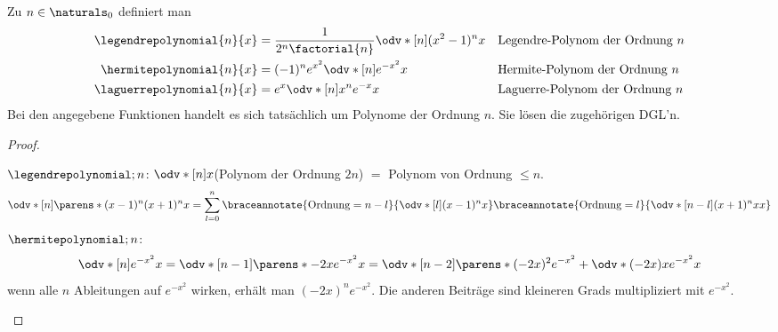 \begin{lemma}
  Zu \( n\in \naturals_0 \) definiert man
  \begin{align*}
    \legendrepolynomial{n}{x}&=\frac{1}{2^n \factorial{n}}\odv*[n]{(x^2-1)^n}{x}&&\text{Legendre-Polynom der Ordnung \( n \)}\\
    \hermitepolynomial{n}{x}&=(-1)^n e^{x^2}\odv*[n]{e^{-x^2}}{x}&&\text{Hermite-Polynom der Ordnung \( n \)}\\
    \laguerrepolynomial{n}{x}&=e^x\odv*[n]{x^n e^{-x}}{x}&&\text{Laguerre-Polynom der Ordnung \( n \)}
  \end{align*}
  Bei den angegebene Funktionen handelt es sich tatsächlich um Polynome der Ordnung \( n \). Sie lösen die zugehörigen DGL'n.
\end{lemma}
\begin{proof}
  \begin{proofdescription}
    \item[\ordinalnum{1} \Beh] \( \legendrepolynomial;{n} \): \( \odv*[n]{}{x} \)(Polynom der Ordnung \( 2n \)) \( = \) Polynom von Ordnung \( \leq n \).
    \begin{equation*}
      \odv*[n]{\parens*{(x-1)^n(x+1)^n}}{x}=\sum_{l=0}^{n}\braceannotate{\text{Ordnung}=n-l}{\odv*[l]{(x-1)^n}{x}}\braceannotate{\text{Ordnung}=l}{\odv*[n-l]{(x+1)^n{x}}{x}}
    \end{equation*}
    \( \hermitepolynomial;{n} \):
    \begin{equation*}
      \odv*[n]{e^{-x^2}}{x}=\odv*[n-1]{\parens*{-2xe^{-x^2}}}{x}=\odv*[n-2]{\parens*{(-2x)^2e^{-x^2}+\odv*{(-2x)}{x}e^{-x^2}}}{x}
    \end{equation*}
    \timplies wenn alle \( n \) Ableitungen auf \( e^{-x^2} \) wirken, erhält man \( (-2x)^n e^{-x^2} \). Die anderen Beiträge sind kleineren Grads multipliziert mit \( e^{-x^2} \).


\end{proofdescription}
\end{proof}
